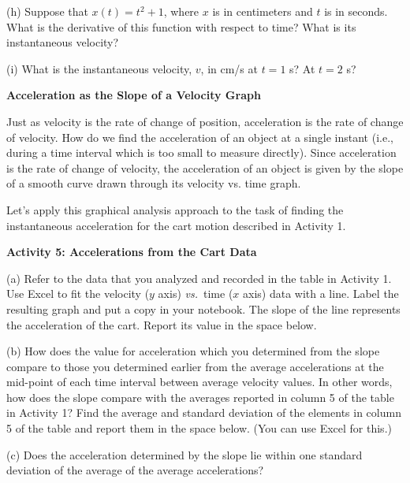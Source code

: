 (h) Suppose that $x(t) = t^{2} + 1$, where $x$ is in centimeters and $t$ is
in seconds. What is the derivative of this function with respect to time? What
is its instantaneous velocity?
\vspace{20mm}

(i) What is the instantaneous velocity, $v$, in cm/s at $t = 1$ s? At 
$t = 2$ s?
\answerspace{20mm}

\pagebreak[2]
\textbf{Acceleration as the Slope of a Velocity Graph} 

Just as velocity is the rate of change of position, acceleration is the rate
of change of velocity. How do we find the acceleration of an object at a single
instant (i.e., during a time interval which is too small to measure directly).
Since acceleration is the rate of change of velocity, the acceleration of an
object is given by the slope of a smooth curve drawn through its velocity vs.
time graph.

Let's apply this graphical analysis approach to the task of finding the instantaneous
acceleration for the cart motion described in Activity 1.

\textbf{Activity 5: Accelerations from the Cart Data }

(a) Refer to the data that you analyzed and recorded in the table in Activity
1. Use Excel to fit the velocity ($y$ axis) \textit{vs.}~time ($x$ axis) data with
a line. Label the resulting graph and put a copy in your notebook. The slope
of the line represents the acceleration of the cart. Report its value in the
space below.
\vspace{10mm}

(b) How does the value for acceleration which you determined from the slope
compare to those you determined earlier from the average accelerations at the
mid-point of each time interval between average velocity values. In other words,
how does the slope compare with the averages reported in column 5 of the table
in Activity 1? Find the average and standard deviation of the elements in column
5 of the table and report them in the space below. (You can use Excel
for this.)
\vspace{20mm}

(c) Does the acceleration determined by the slope lie within one standard deviation
of the average of the average accelerations? 

